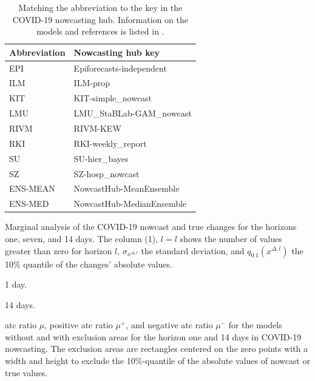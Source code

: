 \documentclass[pdflatex]{sn-jnl}
\theoremstyle{plain}%
\theoremstyle{definition}
\newcommand{\acc}{\mu}
\newcommand{\accp}{\acc^+}
\newcommand{\accm}{\acc^-}
\begin{document}
\begin{table}
    \centering
    \begin{tabular}{l l}
        \toprule
        Abbreviation & Nowcasting hub key \\
        \midrule
        EPI & Epiforecasts-independent \\
        ILM & ILM-prop \\
        KIT & KIT-simple\_nowcast \\
        LMU & LMU\_StaBLab-GAM\_nowcast \\
        RIVM & RIVM-KEW \\
        RKI & RKI-weekly\_report \\
        SU & SU-hier\_bayes \\
        SZ & SZ-hosp\_nowcast\\
        ENS-MEAN & NowcastHub-MeanEnsemble\\
        ENS-MED & NowcastHub-MedianEnsemble\\
        \bottomrule
    \end{tabular}
    \caption[Matching the abbreviation to the key in the COVID-19 nowcasting hub.]{Matching the abbreviation to the key in the COVID-19 nowcasting hub.
    Information on the models and references is listed in \citet[][Table 1]{Wolffram2023}.}
    \label{tab:app-covid-models}
\end{table}


\begin{table}
    \centering
    \tiny
    
    \caption[Marginal analysis of the COVID-19 nowcast and true changes for the horizons one, seven, and 14 days.]{Marginal analysis of the COVID-19 nowcast and true changes for the horizons one, seven, and 14 days.
    The column (1), $l=l$ shows the number of values greater than zero for horizon $l$, $\sigma_{x^{\Delta, l}}$ the standard deviation, and $q_{0.1} (x^{\Delta, l})$ the 10\% quantile of the changes' absolute values.}
    \label{tab:app-covid-marginals}
\end{table}

\begin{table}
    \centering
    \tiny
    \begin{subtable}[t]{\textwidth}
        
    \caption{1 day.}
    \end{subtable}
    \begin{subtable}[t]{\textwidth}
        
        \caption{14 days.}
    \end{subtable}
    \caption[ATC ratios for the models without and with exclusion areas for the horizon one and 14 days in COVID-19 nowcasting.]{\Ac{atc} ratio $\acc$, positive \ac{atc} ratio $\accp$, and negative \ac{atc} ratio $\accm$ for the models without and with exclusion areas for the horizon one and 14 days in COVID-19 nowcasting. The exclusion areas are rectangles centered on the zero points with a width and height to exclude the 10\%-quantile of the absolute values of nowcast or true values. }
    \label{tab:app-covid-atc-ratios-lag-1-14}
\end{table}
\end{document}
